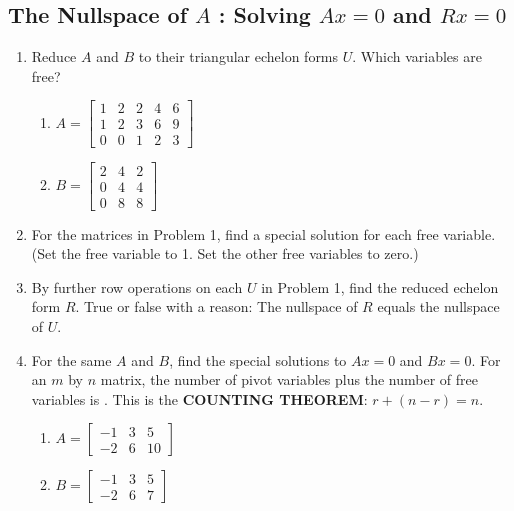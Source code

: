 \documentclass[14pt, a4paper]{article}
\begin{document}
\subsection{The Nullspace of $A$ : Solving $Ax=0$ and $Rx=0$}
\begin{enumerate}
    \item Reduce $A$ and $B$ to their triangular echelon forms $U$. Which variables are free?
          \begin{enumerate}
              \item $A = \begin{bmatrix}
                            1 & 2 & 2 & 4 & 6 \\
                            1 & 2 & 3 & 6 & 9 \\
                            0 & 0 & 1 & 2 & 3
                        \end{bmatrix}$
              \item $B = \begin{bmatrix}
                            2 & 4 & 2 \\
                            0 & 4 & 4 \\
                            0 & 8 & 8
                        \end{bmatrix}$
          \end{enumerate}

    \item For the matrices in Problem 1, find a special solution for each free variable. (Set the free variable to 1. Set the other free variables to zero.)

    \item By further row operations on each $U$ in Problem 1, find the reduced echelon form $R$. True or false with a reason: The nullspace of $R$ equals the nullspace of $U$.

    \item For the same $A$ and $B$, find the special solutions to $Ax = 0$ and $Bx = 0$. For an $m$ by $n$ matrix, the number of pivot variables plus the number of free variables is \underline{\hspace{2cm}}. This is the \textbf{COUNTING THEOREM}: $r + (n - r) = n$.
          \begin{enumerate}
              \item $A = \begin{bmatrix}
                            -1 & 3 & 5  \\
                            -2 & 6 & 10
                        \end{bmatrix}$
              \item $B = \begin{bmatrix}
                            -1 & 3 & 5 \\
                            -2 & 6 & 7
                        \end{bmatrix}$
          \end{enumerate}
\end{enumerate}
\end{document}

